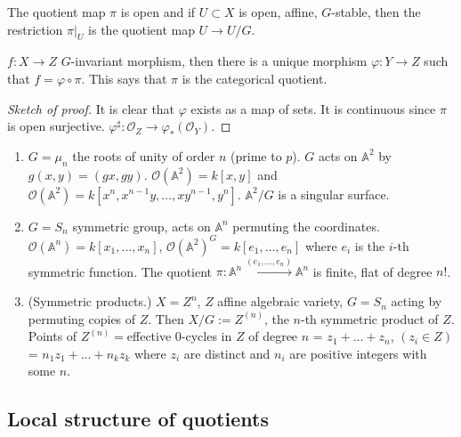 \begin{proposition}
\label{proposition-2-second}
The quotient map $\pi$ is open and if $U\subset X$ is open, affine, $G$-stable, 
then the restriction $\pi|_{U}$ is the quotient map $U\to U/G$.
\end{proposition}

\begin{proposition}
\label{proposition-quotient-map-is-categorical-quotient}
$f:X\to Z$ $G$-invariant morphism, then there is a unique morphism $\varphi:Y
\to Z$ such that $f=\varphi \circ\pi$. This says that $\pi$ is the categorical
quotient.
\end{proposition}

\begin{proof}[Sketch of proof]
It is clear that $\varphi$ exists as a map of sets. It is continuous since
$\pi$ is open surjective. $\varphi^\sharp:\mathcal{O}_Z \to
\varphi_*(\mathcal{O}_Y)$.
\end{proof}

\begin{example}
\label{example-quotients}
 \begin{enumerate}
\item $G=\mu_n$ the roots of unity of order $n$ (prime to $p$). $G$ acts on
$\mathbb{A}^2$ by $g(x,y)=(gx,gy)$.  $\mathcal{O}(\mathbb{A}^2)=k[x,y]$ and
$\mathcal{O}(\mathbb{A}^2)=k[x^n,x^{n-1}y,\ldots,xy^{n-1},y^n]$.
$\mathbb{A}^2/G$ is a singular surface.
\item $G=S_n$ symmetric group, acts on $\mathbb{A}^n$ permuting the coordinates.
$\mathcal{O}(\mathbb{A}^n)=k[x_1,\ldots,x_n]$,
$\mathcal{O}(\mathbb{A}^2)^G=k[e_1,\ldots,e_n]$ where $e_i$ is the $i$-th
symmetric function. The quotient
$\pi:\mathbb{A}^n\xrightarrow{(e_1,\ldots,e_n)}\mathbb{A}^n$ is finite, flat of
degree $n!$.
\item (Symmetric products.) $X=Z^n$, $Z$ affine algebraic variety, $G=S_n$
acting by permuting copies of $Z$. Then $X/G:=Z^{(n)}$, the $n$-th symmetric
product of $Z$. Points of $Z^{(n)}=$effective $0$-cycles in $Z$ of degree $n$ =
$z_1+\ldots+z_n$, $(z_i \in Z)$ = $n_1z_1+\ldots+n_kz_k$ where $z_i$ are
distinct and $n_i$ are positive integers with some $n$.
\end{enumerate}
\end{example}

\subsection*{Local structure of quotients}
\label{subsection-local-structure-of-quotients}

